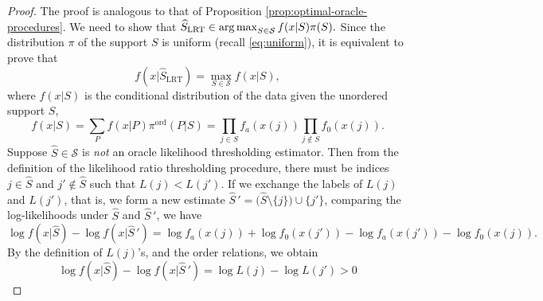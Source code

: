 
\begin{proof}%
The proof is analogous to that of Proposition \ref{prop:optimal-oracle-procedures}.
We need to show that
$
\widehat{S}_{\rm LRT} \in \operatorname*{arg\,max}_{S \in \mathcal{S}} f(x|S) \pi(S).
$
Since the distribution $\pi$ of the support $S$ 
is uniform (recall \eqref{eq:uniform}), it is equivalent to prove that 
$$
f(x|\widehat{S}_{\text{LRT}}) = \max_{S \in \mathcal {S}} f(x|S),
$$ 
where  $f(x|S)$ is the conditional distribution of the data given the unordered support $S$,
\begin{equation} \label{eq:likelihood-ratio-thresholding-proof}
    f(x|S) = \sum_P f(x|P) \pi^{\text{ord}}(P|S) = \prod_{j\in S} f_a(x(j)) \prod_{j\not\in S}{f_0(x(j))}.
\end{equation}
Suppose $\widehat S\in {\mathcal S}$ is {\em not} an oracle likelihood thresholding estimator. 
Then from the definition of the likelihood ratio thresholding procedure, there 
must be indices 
$j \in \widehat S$ and $j' \not \in \widehat{S}$ such that $L(j) < L(j')$.
If we exchange the labels of $L(j)$ and $L(j')$, that is, we form a new estimate 
$\widehat{S}\,' = \big(\widehat{S}\setminus\{j\}\big)\cup\{j'\}$,
comparing the log-likelihoods under $\widehat{S}$ and $\widehat{S}\,'$, we have
\begin{equation*}
    \log{f(x|\widehat{S})} - \log{f(x|\widehat{S}\,')} 
    = \log{f_a(x(j))} + \log{f_0(x(j'))} - \log{f_a(x(j'))} - \log{f_0(x(j))}.
\end{equation*}
By the definition of $L(j)$'s, and the order relations, we obtain
\begin{equation*}
    \log{f(x|\widehat{S})} - \log{f(x|\widehat{S}\,')} 
    = \log{L(j)} - \log{L(j')} > 0
\end{equation*}
\end{proof}


